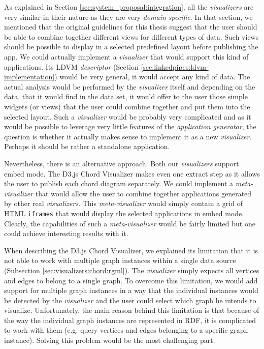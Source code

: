 As explained in Section \ref{sec:system_proposal:integration}, all the \emph{visualizers} are very similar in their nature as they are very \emph{domain specific}. In that section, we mentioned that the original guidelines for this thesis suggest that the user should be able to combine together different views for different types of data. Such views should be possible to display in a selected predefined layout before publishing the app. We could actually implement a \emph{visualizer} that would support this kind of applications. Its LDVM \emph{descriptor} (Section \ref{sec:linkedpipes:ldvm-implementation}) would be very general, it would accept any kind of data. The actual analysis would be performed by the \emph{visualizer} itself and depending on the data, that it would find in the data set, it would offer to the user those simple widgets (or views) that the user could combine together and put them into the selected layout. Such a \emph{visualizer} would be probably very complicated and as it would be possible to leverage very little features of the \emph{application generator}, the question is whether it actually makes sense to implement it as a new \emph{visualizer}. Perhaps it should be rather a standalone application.

Nevertheless, there is an alternative approach. Both our \emph{visualizers} support embed mode. The D3.js Chord Visualizer makes even one extract step as it allows the user to publish each chord diagram separately. We could implement a \emph{meta-visualizer} that would allow the user to combine together applications generated by other real \emph{visualizers}. This \emph{meta-visualizer} would simply contain a grid of HTML \texttt{iframes} that would display the selected applications in embed mode. Clearly, the capabilities of such a \emph{meta-visualizer} would be fairly limited but one could achieve interesting results with it.

When describing the D3.js Chord Visualizer, we explained its limitation that it is not able to work with multiple graph instances within a single data source (Subsection \ref{sec:visualizers:chord:rgml}). The \emph{visualizer} simply expects all vertices and edges to belong to a single graph. To overcome this limitation, we would add support for multiple graph instances in a way that the individual instances would be detected by the \emph{visualizer} and the user could select which graph he intends to visualize. Unfortunately, the main reason behind this limitation is that because of the way the individual graph instances are represented in RDF, it is complicated to work with them (e.g. query vertices and edges belonging to a specific graph instance). Solving this problem would be the most challenging part.

